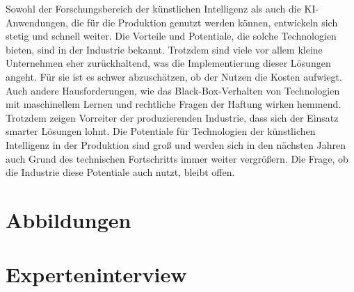 \documentclass[a4paper,12pt, german]{report}
\begin{document}
Sowohl der Forschungsbereich der künstlichen Intelligenz als auch die KI-Anwendungen, die für die Produktion genutzt werden können, entwickeln sich stetig und schnell weiter. Die Vorteile und Potentiale, die solche Technologien bieten, sind in der Industrie bekannt. Trotzdem sind viele vor allem kleine Unternehmen eher zurückhaltend, was die Implementierung dieser Lösungen angeht. Für sie ist es schwer abzuschätzen, ob der Nutzen die Kosten aufwiegt. Auch andere Hausforderungen, wie das Black-Box-Verhalten von Technologien mit maschinellem Lernen und rechtliche Fragen der Haftung wirken hemmend. Trotzdem zeigen Vorreiter der produzierenden Industrie, dass sich der Einsatz smarter Lösungen lohnt. Die Potentiale für Technologien der künstlichen Intelligenz in der Produktion sind groß und werden sich in den nächsten Jahren auch Grund des technischen Fortschritts immer weiter vergrößern. Die Frage, ob die Industrie diese Potentiale auch nutzt, bleibt offen.

\listoffigures

\clearpage




\appendix
\section{Abbildungen}



\section{Experteninterview}
\end{document}
